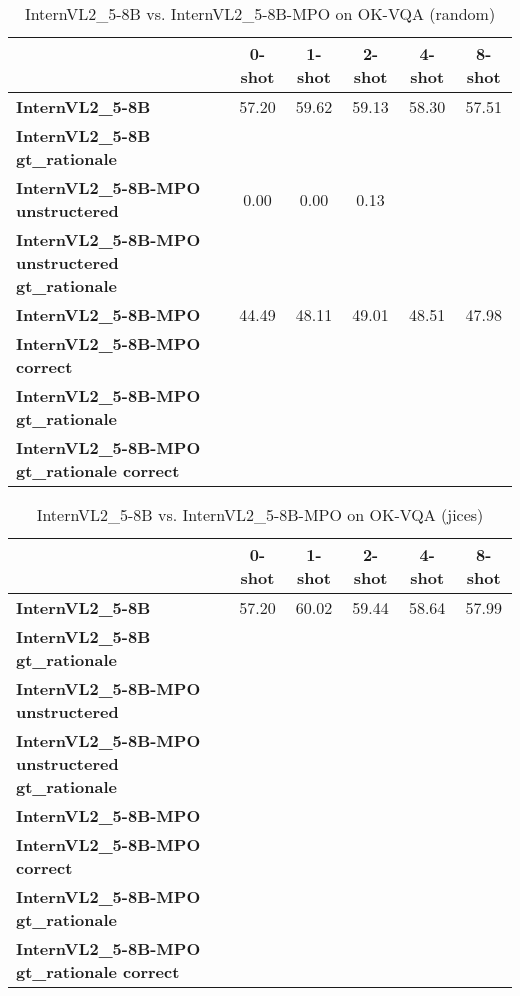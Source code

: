 \begin{table}
\caption{InternVL2\_5-8B vs. InternVL2\_5-8B-MPO on OK-VQA (random)}
\label{tab:InternVL2_5-8B_OK-VQA_TRAIN_random}
\begin{tabular}{lccccc}
\toprule
 & 0-shot & 1-shot & 2-shot & 4-shot & 8-shot \\
\midrule
\textbf{InternVL2\_5-8B} & 57.20 & 59.62 & 59.13 & 58.30 & 57.51 \\
\textbf{InternVL2\_5-8B gt\_rationale} &  &  &  &  &  \\
\textbf{InternVL2\_5-8B-MPO unstructered} & 0.00 & 0.00 & 0.13 &  &  \\
\textbf{InternVL2\_5-8B-MPO unstructered gt\_rationale} &  &  &  &  &  \\
\textbf{InternVL2\_5-8B-MPO} & 44.49 & 48.11 & 49.01 & 48.51 & 47.98 \\
\textbf{InternVL2\_5-8B-MPO correct} &  &  &  &  &  \\
\textbf{InternVL2\_5-8B-MPO gt\_rationale} &  &  &  &  &  \\
\textbf{InternVL2\_5-8B-MPO gt\_rationale correct} &  &  &  &  &  \\
\bottomrule
\end{tabular}
\end{table}


\begin{table}
\caption{InternVL2\_5-8B vs. InternVL2\_5-8B-MPO on OK-VQA (jices)}
\label{tab:InternVL2_5-8B_OK-VQA_TRAIN_jices}
\begin{tabular}{lccccc}
\toprule
 & 0-shot & 1-shot & 2-shot & 4-shot & 8-shot \\
\midrule
\textbf{InternVL2\_5-8B} & 57.20 & 60.02 & 59.44 & 58.64 & 57.99 \\
\textbf{InternVL2\_5-8B gt\_rationale} &  &  &  &  &  \\
\textbf{InternVL2\_5-8B-MPO unstructered} &  &  &  &  &  \\
\textbf{InternVL2\_5-8B-MPO unstructered gt\_rationale} &  &  &  &  &  \\
\textbf{InternVL2\_5-8B-MPO} &  &  &  &  &  \\
\textbf{InternVL2\_5-8B-MPO correct} &  &  &  &  &  \\
\textbf{InternVL2\_5-8B-MPO gt\_rationale} &  &  &  &  &  \\
\textbf{InternVL2\_5-8B-MPO gt\_rationale correct} &  &  &  &  &  \\
\bottomrule
\end{tabular}
\end{table}
